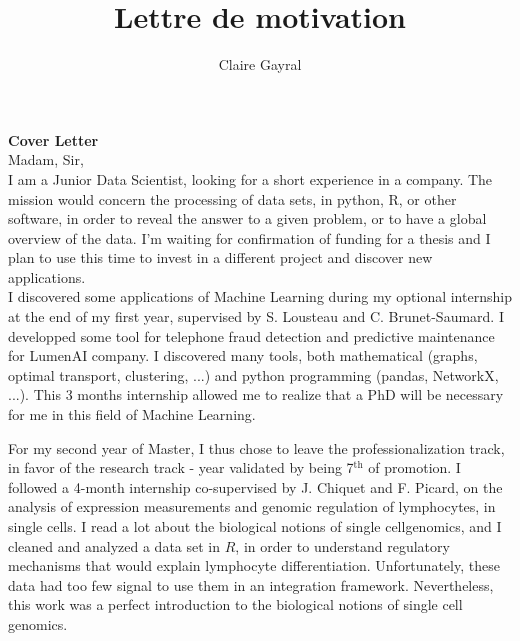 \documentclass[a4paper,11pt]{article}
\title{Lettre de motivation}
\author{Claire Gayral}
\date{}
\begin{document}
{\centering \Large \bf Cover Letter  \\ \vspace{0.6cm} }
Madam, Sir, 
\\

I am a Junior Data Scientist, looking for a short experience in a company. The mission would concern the processing of data sets, in python, R, or other software, in order to reveal the answer to a given problem, or to have a global overview of the data. 
I'm waiting for confirmation of funding for a thesis and I plan to use this time to invest in a different project and discover new applications. \\

I discovered some applications of Machine Learning during my optional internship at the end of my first year, supervised by S. Lousteau and C. Brunet-Saumard.
I developped some tool for telephone fraud detection and predictive maintenance for LumenAI company.  I discovered many tools, both mathematical (graphs, optimal transport, clustering, ...) and python programming (pandas, NetworkX, ...). 
This 3 months internship allowed me to realize that a PhD will be necessary for me  in this field of Machine Learning. 

For my second year of Master, I thus chose to leave the professionalization track, in favor of the research track - year validated by being 7$^{\text{th}}$ of promotion. 
I followed a 4-month internship co-supervised by J. Chiquet and F. Picard, on the analysis of expression measurements and genomic regulation of lymphocytes, in single cells. I read a lot about the biological notions of single cellgenomics, and I cleaned and analyzed a data set in $R$, in order to understand regulatory mechanisms that would explain lymphocyte differentiation. Unfortunately, these data had too few signal to use them in an integration framework. Nevertheless, this work was a perfect introduction to the biological notions of single cell genomics.
\end{document}
